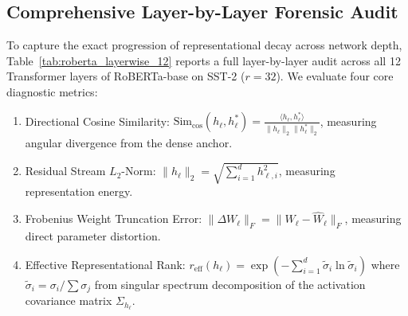 \documentclass{article}
\begin{document}
\subsection{Comprehensive Layer-by-Layer Forensic Audit}
To capture the exact progression of representational decay across network depth, Table~\ref{tab:roberta_layerwise_12} reports a full layer-by-layer audit across all 12 Transformer layers of RoBERTa-base on SST-2 ($r=32$). We evaluate four core diagnostic metrics:
\begin{enumerate}
    \item Directional Cosine Similarity: $\text{Sim}_{\cos}(h_\ell, h_\ell^*) = \frac{\langle h_\ell, h_\ell^* \rangle}{\|h_\ell\|_2 \|h_\ell^*\|_2}$, measuring angular divergence from the dense anchor.
    \item Residual Stream $L_2$-Norm: $\|h_\ell\|_2 = \sqrt{\sum_{i=1}^d h_{\ell, i}^2}$, measuring representation energy.
    \item Frobenius Weight Truncation Error: $\|\Delta W_\ell\|_F = \|W_\ell - \hat{W}_\ell\|_F$, measuring direct parameter distortion.
    \item Effective Representational Rank: $r_{\text{eff}}(h_\ell) = \exp\left(-\sum_{i=1}^d \tilde{\sigma}_i \ln \tilde{\sigma}_i\right)$ where $\tilde{\sigma}_i = \sigma_i / \sum \sigma_j$ from singular spectrum decomposition of the activation covariance matrix $\Sigma_{h_\ell}$.
\end{enumerate}
\end{document}
